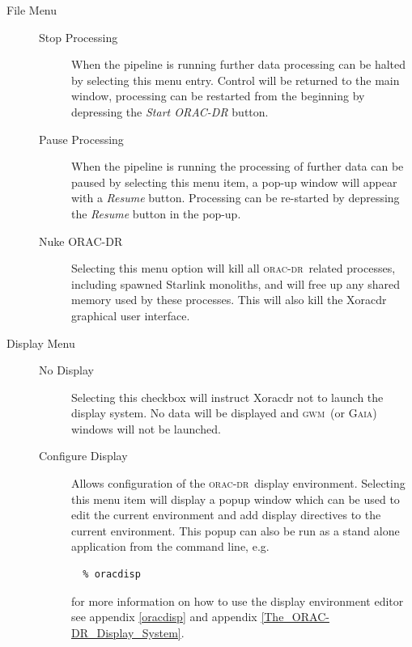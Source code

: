 \documentclass[twoside,11pt]{article}
\newcommand{\xref}[3]{#1}
\renewcommand{\_}{\texttt{\symbol{95}}}
\newcommand{\oracdr}{\textsc{orac-dr}}
\newcommand{\gaia}{\xref{{\textsc{Gaia}}}{sun214}{}}
\newcommand{\gwm}{\xref{\textsc{gwm}}{sun219}{}}
\begin{document}
\begin{description}
\item[File Menu] \mbox{}\begin{description}
\item[Stop Processing] \mbox{}

When the pipeline is running further data processing can be halted by
selecting this menu entry. Control will be returned to the main
window, processing can be restarted from the beginning by depressing
the \textit{Start ORAC-DR} button.

\item[Pause Processing] \mbox{}

When the pipeline is running the processing of further data can be
paused by selecting this menu item, a pop-up window will appear with a
\textit{Resume} button. Processing can be re-started by depressing the
\textit{Resume} button in the pop-up.

\item[Nuke ORAC-DR] \mbox{}

Selecting this menu option will kill all \oracdr\ related processes,
including spawned Starlink monoliths, and will free up any shared
memory used by these processes. This will also kill the Xoracdr
graphical user interface.

\end{description}
\item[Display Menu] \mbox{}\begin{description}
\item[No Display] \mbox{}

Selecting this checkbox will instruct Xoracdr not to launch the
display system. No data will be displayed and \gwm\ (or \gaia) windows
will not be launched.

\item[Configure Display] \mbox{}

Allows configuration of the \oracdr\ display environment. Selecting
this menu item will display a popup window which can be used to edit
the current environment and add display directives to the current
environment. This popup can also be run as a stand alone application
from the command line, e.g.

\begin{verbatim}
  % oracdisp
\end{verbatim}


for more information on how to use the display environment editor see
appendix \ref{oracdisp} and appendix \ref{The_ORAC-DR_Display_System}.


\end{description}
\end{description}
\end{document}
